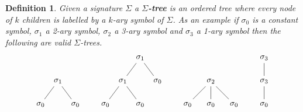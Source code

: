 \documentclass[letterpaper, 11pt, oneside]{memoir}
\theoremstyle{myteo}
\newtheorem{definition}[theorem]{Definition}
\numberwithin{equation}{section}
\begin{document}
\begin{definition}
  Given a signature \(\Sigma\) a \textbf{\(\Sigma\)-tree} is an ordered tree where every node of \(k\) children is labelled by a \(k\)-ary symbol of \(\Sigma\).
  As an example if \(\sigma_0\) is a constant symbol, \(\sigma_1\) a 2-ary symbol, \(\sigma_2\) a 3-ary symbol and \(\sigma_3\) a 1-ary symbol then the following are valid \(\Sigma\)-trees.
  \begin{equation*}
    \begin{tikzpicture}
      \node (1) at (0, 1){\(\sigma_1\)};
      \node (2) at (-0.75, 0){\(\sigma_0\)};
      \node (3) at (0.75, 0){\(\sigma_0\)};

      \draw[-] (1) -- (2);
      \draw[-] (1) -- (3);
    \end{tikzpicture}\quad\quad
    \begin{tikzpicture}
      \node (1) at (0, 1){\(\sigma_1\)};
      \node (2) at (-0.75, 0){\(\sigma_0\)};
      \node (3) at (0.75, 0){\(\sigma_0\)};
      \node (4) at (0.75, 2){\(\sigma_1\)};
      \node (5) at (1.5, 1){\(\sigma_0\)};
      
      \draw[-] (1) -- (2);
      \draw[-] (1) -- (3);
      \draw[-] (4) -- (5);
      \draw[-] (4) -- (1);
    \end{tikzpicture}\quad\quad
    \begin{tikzpicture}
      \node (1) at (0, 1){\(\sigma_2\)};
      \node (2) at (-1, 0){\(\sigma_0\)};
      \node (3) at (0, 0){\(\sigma_0\)};
      \node (4) at (1, 0){\(\sigma_0\)};

      \draw[-] (1) -- (2);
      \draw[-] (1) -- (3);
      \draw[-] (1) -- (4);
    \end{tikzpicture}\quad\quad
    \begin{tikzpicture}
      \node (1) at (0, 0){\(\sigma_0\)};
      \node (2) at (0, 1){\(\sigma_3\)};
      \node (3) at (0, 2){\(\sigma_3\)};

      \draw[-] (1) -- (2) -- (3);
    \end{tikzpicture}
  \end{equation*}
\end{definition}
\end{document}
